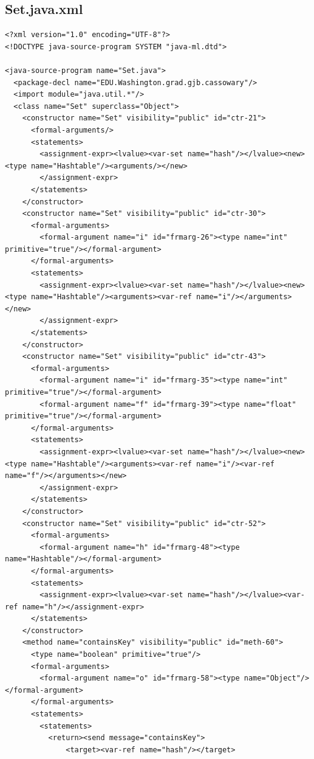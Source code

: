 \documentclass{article}
\begin{document}
\subsection{Set.java.xml}

\begin{verbatim}
<?xml version="1.0" encoding="UTF-8"?>
<!DOCTYPE java-source-program SYSTEM "java-ml.dtd">

<java-source-program name="Set.java">
  <package-decl name="EDU.Washington.grad.gjb.cassowary"/>
  <import module="java.util.*"/>
  <class name="Set" superclass="Object">
    <constructor name="Set" visibility="public" id="ctr-21">
      <formal-arguments/>
      <statements>
        <assignment-expr><lvalue><var-set name="hash"/></lvalue><new><type name="Hashtable"/><arguments/></new>
        </assignment-expr>
      </statements>
    </constructor>
    <constructor name="Set" visibility="public" id="ctr-30">
      <formal-arguments>
        <formal-argument name="i" id="frmarg-26"><type name="int" primitive="true"/></formal-argument>
      </formal-arguments>
      <statements>
        <assignment-expr><lvalue><var-set name="hash"/></lvalue><new><type name="Hashtable"/><arguments><var-ref name="i"/></arguments></new>
        </assignment-expr>
      </statements>
    </constructor>
    <constructor name="Set" visibility="public" id="ctr-43">
      <formal-arguments>
        <formal-argument name="i" id="frmarg-35"><type name="int" primitive="true"/></formal-argument>
        <formal-argument name="f" id="frmarg-39"><type name="float" primitive="true"/></formal-argument>
      </formal-arguments>
      <statements>
        <assignment-expr><lvalue><var-set name="hash"/></lvalue><new><type name="Hashtable"/><arguments><var-ref name="i"/><var-ref name="f"/></arguments></new>
        </assignment-expr>
      </statements>
    </constructor>
    <constructor name="Set" visibility="public" id="ctr-52">
      <formal-arguments>
        <formal-argument name="h" id="frmarg-48"><type name="Hashtable"/></formal-argument>
      </formal-arguments>
      <statements>
        <assignment-expr><lvalue><var-set name="hash"/></lvalue><var-ref name="h"/></assignment-expr>
      </statements>
    </constructor>
    <method name="containsKey" visibility="public" id="meth-60">
      <type name="boolean" primitive="true"/>
      <formal-arguments>
        <formal-argument name="o" id="frmarg-58"><type name="Object"/></formal-argument>
      </formal-arguments>
      <statements>
        <statements>
          <return><send message="containsKey">
              <target><var-ref name="hash"/></target>

\end{verbatim}
\end{document}
